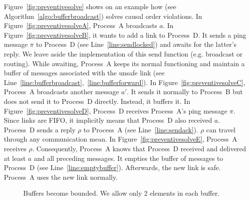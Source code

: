 Figure~\ref{fig:preventivesolve} shows on an example how \CBROADCAST (see
Algorithm~\ref{algo:bufferbroadcast}) solves causal order violations. In
Figure~\ref{fig:preventivesolveA}, Process~A broadcasts $a$.  In
Figure~\ref{fig:preventivesolveB}, it wants to add a link to Process~D. It sends
a ping message $\pi$ to Process~D (see Line~\ref{line:sendlocked}) and awaits
for the latter's reply.  We leave aside the implementation of this send function
(e.g. broadcast or routing).  While awaiting, Process~A keeps its normal
functioning and maintain a buffer of messages associated with the unsafe link
(see Line~\ref{line:bufferbroadcast},~\ref{line:bufferforward}). In
Figure~\ref{fig:preventivesolveC}, Process~A broadcasts another message $a'$. It
sends it normally to Process~B but does not send it to Process~D
directly. Instead, it buffers it. In Figure~\ref{fig:preventivesolveD},
Process~D receives Process~A's ping message $\pi$. Since links are FIFO, it
implicitly means that Process~D also received $a$. Process~D sends a reply
$\rho$ to Process~A (see Line~\ref{line:sendack}). $\rho$ can travel through any
communication mean. In Figure~\ref{fig:preventivesolveE}, Process~A receives
$\rho$. Consequently, Process~A knows that Process~D received and delivered at
least $a$ and all preceding messages. It empties the buffer of messages to
Process~D (see Line~\ref{line:emptybuffer}). Afterwards, the new link is
safe. Process~A uses the new link normally.

\begin{figure*}
  \begin{center}
    \hspace{20pt}
    \hspace{20pt}
    \hspace{20pt}
    \hspace{20pt}
    \caption{\label{fig:buffersolve}Buffers become bounded. We allow only 2
      elements in each buffer.}
  \end{center}
\end{figure*}


